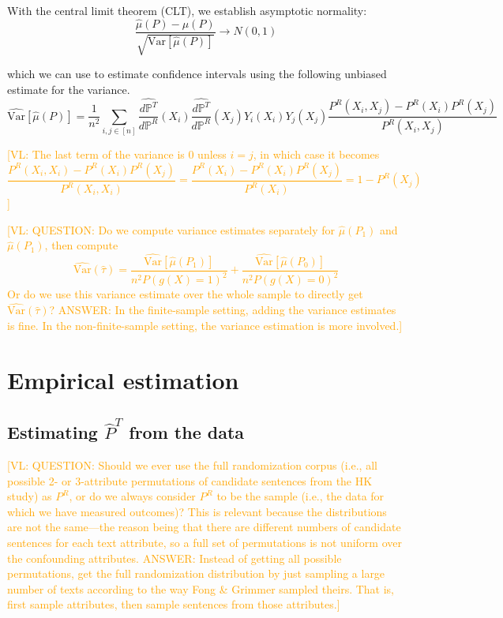 \documentclass{article}
\newcommand{\vl}[1]{\textcolor{orange}{[VL: #1]}}
\begin{document}
With the central limit theorem (CLT), we establish asymptotic normality:
\begin{equation*}
    \frac{\hat{\mu}(P) - \mu(P)}{\sqrt{\text{Var}[\hat{\mu}(P)]}}\rightarrow N(0,1)
\end{equation*}

which we can use to estimate confidence intervals using the following unbiased estimate for the variance.
\begin{equation*}
    \widehat{\text{Var}}[\hat{\mu}(P)] = \frac{1}{n^2} \sum_{i,j \in [n]} \frac{\hat{d \mathbb{P}^T}}{d \mathbb{P}^R}(X_i)\frac{\hat{d \mathbb{P}^T}}{d \mathbb{P}^R}(X_j)Y_i(X_i)Y_j(X_j)\frac{P^R(X_i,X_j) - P^R(X_i)P^R(X_j)}{P^R(X_i,X_j)}
\end{equation*}

\vl{The last term of the variance is 0 unless $i=j$, in which case it becomes $$\frac{P^R(X_i,X_i)-P^R(X_i)P^R(X_j)}{P^R(X_i,X_i)} = \frac{P^R(X_i)-P^R(X_i)P^R(X_j)}{P^R(X_i)} = 1-P^R(X_j)$$}

\vl{QUESTION: Do we compute variance estimates separately for $\hat{\mu}(P_1)$ and $\hat{\mu}(P_1)$, then compute $$\widehat{\text{Var}}(\hat{\tau})=\frac{\widehat{\text{Var}}[\hat{\mu}(P_1)]}{n^2P(g(X)=1)^2} + \frac{\widehat{\text{Var}}[\hat{\mu}(P_0)]}{n^2P(g(X)=0)^2}$$ Or do we use this variance estimate over the whole sample to directly get $\widehat{\text{Var}}(\hat{\tau})$?
ANSWER: In the finite-sample setting, adding the variance estimates is fine. In the non-finite-sample setting, the variance estimation is more involved.}

\section{Empirical estimation}
\subsection{Estimating $\hat{P}^T$ from the data}

\vl{QUESTION: Should we ever use the full randomization corpus (i.e., all possible 2- or 3-attribute permutations of candidate sentences from the HK study) as $P^R$, or do we always consider $P^R$ to be the sample (i.e., the data for which we have measured outcomes)? This is relevant because the distributions are not the same---the reason being that there are different numbers of candidate sentences for each text attribute, so a full set of permutations is not uniform over the confounding attributes. 
ANSWER: Instead of getting all possible permutations, get the full randomization distribution by just sampling a large number of texts according to the way Fong \& Grimmer sampled theirs. That is, first sample attributes, then sample sentences from those attributes.}
\end{document}
